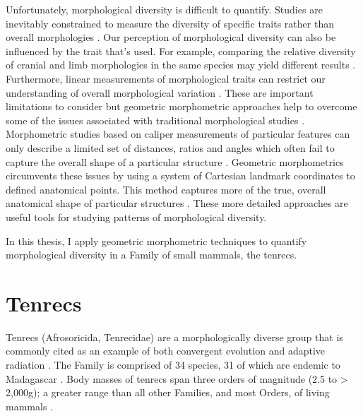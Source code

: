 	Unfortunately, morphological diversity is difficult to quantify. Studies are inevitably constrained to measure the diversity of specific traits rather than overall morphologies \citep{Roy1997}. Our perception of morphological diversity can also be influenced by the trait that's used. For example, comparing the relative diversity of cranial and limb morphologies in the same species may yield different results \citep{Foth2012}. Furthermore, linear measurements of morphological traits can restrict our understanding of overall morphological variation \citep{Rohlf1993}. These are important limitations to consider but geometric morphometric approaches help to overcome some of the issues associated with traditional morphological studies \citep{Adams2004}. Morphometric studies based on caliper measurements of particular features can only describe a limited set of distances, ratios and angles which often fail to capture the overall shape of a particular structure \citep{Slice2007}. Geometric morphometrics circumvents these issues by using a system of Cartesian landmark coordinates to defined anatomical points. This method captures more of the true, overall anatomical shape of particular structures \citep{Mitteroecker2009}. These more detailed approaches are useful tools for studying patterns of morphological diversity.
	
	In this thesis, I apply geometric morphometric techniques to quantify morphological diversity in a Family of small mammals, the tenrecs.
\section{Tenrecs} %
	Tenrecs (Afrosoricida, Tenrecidae) are a morphologically diverse group that is commonly cited as an example of both convergent evolution and adaptive radiation \citep{Soarimalala2011, Eisenberg1969}. 
	The Family is comprised of 34 species, 31 of which are endemic to Madagascar \citep{Olson2013}. Body masses of tenrecs span three orders of magnitude (2.5 to > 2,000g); a greater range than all other Families, and most Orders, of living mammals \citep{Olson2003}.
	

